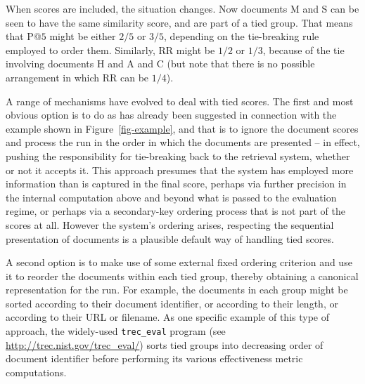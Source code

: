 When scores are included, the situation changes.
Now documents M and S can be seen to have the same similarity score,
and are part of a tied group.
That means that P@$5$ might be either $2/5$ or $3/5$, depending on
the tie-breaking rule employed to order them.
Similarly, RR might be $1/2$ or $1/3$, because of the tie involving
documents H and A and C (but note that there is no
possible arrangement in which RR can be $1/4$).


A range of mechanisms have evolved to deal with tied scores.
The first and most obvious option is to do as has already been
suggested in connection with the example shown in
Figure~\ref{fig-example}, and that is to ignore the document scores
and process the run in the order in which the documents are presented
-- in effect, pushing the responsibility for tie-breaking back to the
retrieval system, whether or not it accepts it.
This approach presumes that the system has employed more information
than is captured in the final score, perhaps via further precision in
the internal computation above and beyond what is passed to the
evaluation regime, or perhaps via a secondary-key ordering process
that is not part of the scores at all.
However the system's ordering arises, respecting the sequential
presentation of documents is a plausible default way of handling tied
scores.


A second option is to make use of some external fixed ordering
criterion and use it to reorder the documents within each tied group,
thereby obtaining a canonical representation for the run.
For example, the documents in each group might be sorted according to
their document identifier, or according to their length, or according
to their URL or filename.
As one specific example of this type of approach, the widely-used
{\tt{trec\_eval}} program (see
{\small\url{http://trec.nist.gov/trec_eval/}}) sorts tied groups into
decreasing order of document identifier before performing its various
effectiveness metric computations.


